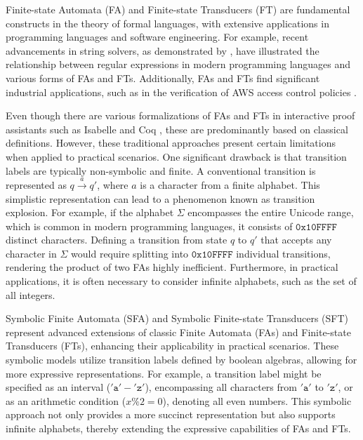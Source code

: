 \documentclass[a4paper,UKenglish,cleveref, autoref, anonymous, thm-restate]{lipics-v2021}
\begin{document}
Finite-state Automata (FA) and Finite-state Transducers (FT) are fundamental constructs in the theory of formal languages, with extensive applications in programming languages and software engineering. For example, recent advancements in string solvers, as demonstrated by \cite{pacmpl/ChenFHHHKLRW22}, have illustrated the relationship between regular expressions in modern programming languages and various forms of FAs and FTs. Additionally, FAs and FTs find significant industrial applications, such as in the verification of AWS access control policies \cite{DBLP:conf/fmcad/BackesBCDGLRTV18}.


Even though there are various formalizations of FAs and FTs in interactive proof assistants such as Isabelle \cite{isabelle-homepage} and Coq \cite{coq-homepage}, these are predominantly based on classical definitions. However, these traditional approaches present certain limitations when applied to practical scenarios. One significant drawback is that transition labels are typically non-symbolic and finite. A conventional transition is represented as $q\xrightarrow{a}q'$, where $a$ is a character from a finite alphabet. This simplistic representation can lead to a phenomenon known as transition explosion. For example, if the alphabet $\Sigma$ encompasses the entire Unicode range, which is common in modern programming languages, it consists of $\texttt{0x10FFFF}$ distinct characters. Defining a transition from state $q$ to $q'$ that accepts any character in $\Sigma$ would require splitting into $\texttt{0x10FFFF}$ individual transitions, rendering the product of two FAs highly inefficient. Furthermore, in practical applications, it is often necessary to consider infinite alphabets, such as the set of all integers.



Symbolic Finite Automata (SFA) and Symbolic Finite-state Transducers (SFT) \cite{cav/DAntoniV17, VeanesHLMB12Transducer} represent advanced extensions of classic Finite Automata (FAs) and Finite-state Transducers (FTs), enhancing their applicability in practical scenarios. These symbolic models utilize transition labels defined by boolean algebras, allowing for more expressive representations. For example, a transition label might be specified as an interval ($'\texttt{a}'-'\texttt{z}'$), encompassing all characters from $'\texttt{a}'$ to $'\texttt{z}'$, or as an arithmetic condition ($x \% 2 = 0$), denoting all even numbers. This symbolic approach not only provides a more succinct representation but also supports infinite alphabets, thereby extending the expressive capabilities of FAs and FTs.
\end{document}
